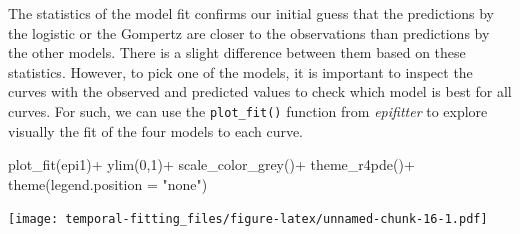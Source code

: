 \documentclass[
  letterpaper,
]{book}
\newenvironment{Shaded}{\begin{snugshade}}{\end{snugshade}}
\newcommand{\AttributeTok}[1]{\textcolor[rgb]{0.40,0.45,0.13}{#1}}
\newcommand{\DecValTok}[1]{\textcolor[rgb]{0.68,0.00,0.00}{#1}}
\newcommand{\FunctionTok}[1]{\textcolor[rgb]{0.28,0.35,0.67}{#1}}
\newcommand{\NormalTok}[1]{\textcolor[rgb]{0.00,0.23,0.31}{#1}}
\newcommand{\SpecialCharTok}[1]{\textcolor[rgb]{0.37,0.37,0.37}{#1}}
\newcommand{\StringTok}[1]{\textcolor[rgb]{0.13,0.47,0.30}{#1}}
\begin{document}
The statistics of the model fit confirms our initial guess that the
predictions by the logistic or the Gompertz are closer to the
observations than predictions by the other models. There is a slight
difference between them based on these statistics. However, to pick one
of the models, it is important to inspect the curves with the observed
and predicted values to check which model is best for all curves. For
such, we can use the \texttt{plot\_fit()} function from \emph{epifitter}
to explore visually the fit of the four models to each curve.

\begin{Shaded}
\begin{Highlighting}[]
\FunctionTok{plot\_fit}\NormalTok{(epi1)}\SpecialCharTok{+}
  \FunctionTok{ylim}\NormalTok{(}\DecValTok{0}\NormalTok{,}\DecValTok{1}\NormalTok{)}\SpecialCharTok{+}
  \FunctionTok{scale\_color\_grey}\NormalTok{()}\SpecialCharTok{+}
  \FunctionTok{theme\_r4pde}\NormalTok{()}\SpecialCharTok{+}
  \FunctionTok{theme}\NormalTok{(}\AttributeTok{legend.position =} \StringTok{"none"}\NormalTok{)}
\end{Highlighting}
\end{Shaded}

\texttt{[image: temporal-fitting\_files/figure-latex/unnamed-chunk-16-1.pdf]}

\begin{Shaded}
\end{Shaded}
\end{document}
